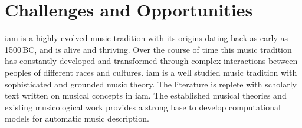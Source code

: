 %
%
%
%
%
%
%
%
%
%
%


\section{Challenges and Opportunities}
\label{sec:intro_challenges_oppurtunities}






\Gls{iam} is a highly evolved music tradition with its origins dating back as early as 1500\,BC, and is alive and thriving. Over the course of time this music tradition has constantly developed and transformed through complex interactions between peoples of different races and cultures. \Gls{iam} is a well studied music tradition with sophisticated and grounded music theory. The literature is replete with scholarly text written on musical concepts in \gls{iam}. The established musical theories and existing musicological work provides a strong base to develop computational models for automatic music description. 


